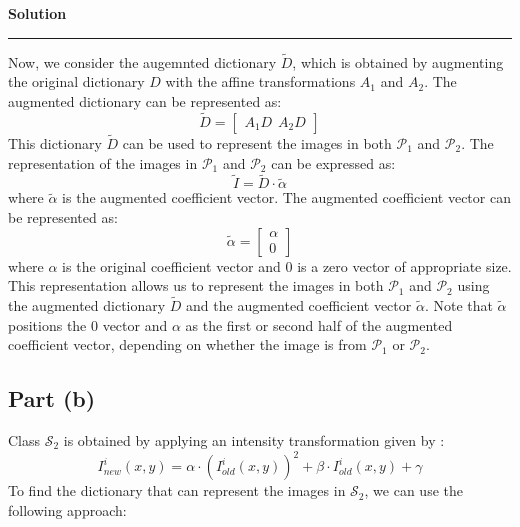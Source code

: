 \documentclass[a4paper,12pt]{article}
\newenvironment{solution}[2][]{%
    \begin{mdframed}[linecolor=blue!70!black, linewidth=2pt, roundcorner=10pt, backgroundcolor=yellow!10!white, skipabove=12pt, skipbelow=12pt]%
        \textbf{\large #2}
        \par\noindent\rule{\textwidth}{0.4pt}
}{
    \end{mdframed}
}
\begin{document}
\begin{solution}{Solution}
\noindent Now, we consider the augemnted dictionary $\tilde{D}$, which is obtained by augmenting the original dictionary $D$ with the affine transformations $A_1$ and $A_2$. The augmented dictionary can be represented as:
\begin{equation}
    \tilde{D} = \begin{bmatrix}
    A_{1} D \hspace{5pt} A_{2} D
    \end{bmatrix}
\end{equation}
This dictionary $\tilde{D}$ can be used to represent the images in both $\mathcal{P}_1$ and $\mathcal{P}_2$. The representation of the images in $\mathcal{P}_1$ and $\mathcal{P}_2$ can be expressed as:
\begin{equation}
    \tilde{I} = \tilde{D} \cdot \tilde{\alpha}
\end{equation}
where $\tilde{\alpha}$ is the augmented coefficient vector. The augmented coefficient vector can be represented as:
\begin{equation}
    \tilde{\alpha} = \begin{bmatrix}
    \alpha \\
    0
    \end{bmatrix}
\end{equation}
where $\alpha$ is the original coefficient vector and $0$ is a zero vector of appropriate size. This representation allows us to represent the images in both $\mathcal{P}_1$ and $\mathcal{P}_2$ using the augmented dictionary $\tilde{D}$ and the augmented coefficient vector $\tilde{\alpha}$. Note that $\tilde{\alpha}$ positions the 0 vector and $\alpha$ as the first or second half of the augmented coefficient vector, depending on whether the image is from $\mathcal{P}_1$ or $\mathcal{P}_2$.

\subsection*{Part (b)}
\noindent Class $\mathcal{S}_2$ is obtained by applying an intensity transformation given by :
\begin{equation}
    I^i_{new}(x, y) = \alpha \cdot (I^i_{old}(x, y))^2 + \beta
 \cdot I^i_{old}(x, y) + \gamma
\end{equation}
To find the dictionary that can represent the images in $\mathcal{S}_2$, we can use the following approach:


\end{solution}
\end{document}
